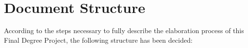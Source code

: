 

\section{Document Structure}

According to the steps necessary to fully describe the elaboration process of this Final Degree Project, the following structure has been decided:

